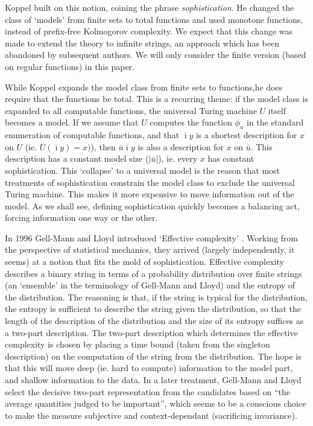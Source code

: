 \documentclass{style/llncs}
\newcommand{\br}[1]{\overline{#1}}
\begin{document}
Koppel \cite{koppelSoph1988,koppel1991almost} built on this notion, coining the phrase \emph{sophistication}. He changed the class of `models' from finite sets to total functions and used monotone functions, instead of prefix-free Kolmogorov complexity. We expect that this change was made to extend the theory to infinite strings, an approach which has been abandoned by subsequent authors. We will only consider the finite version (based on regular functions) in this paper.

While Koppel expands the model class from finite sets to functions,he does require that the functions be total. This is a recurring theme: if the model class is expanded to all computable functions, the universal Turing machine $U$ itself becomes a model. If we assume that $U$ computes the function $\phi_u$ in the standard enumeration of computable functions, and that $\bar\imath y$ is a shortest description for $x$ on $U$ (ie. $U(\bar\imath y) = x)$), then $\br{u}\br{\imath}y$ is also a description for $x$ on $\bar u$. This description has a constant model size ($|\br{u}|$), ie. every $x$ has constant sophistication. This `collapse' to a universal model is the reason that most treatments of sophistication constrain the model class to exclude the universal Turing machine. This makes it more expensive to move information out of the model. As we shall see, defining sophistication quickly becomes a balancing act, forcing information one way or the other.

In 1996 Gell-Mann and Lloyd introduced `Effective complexity' \cite{gellmann1996information}. Working from the perspective of statistical mechanics, they arrived (largely independently, it seems) at a notion that fits the mold of sophistication. Effective complexity describes a binary string in terms of a probability distribution over finite strings (an `ensemble' in the terminology of Gell-Mann and Lloyd) and the entropy of the distribution. The reasoning is that, if the string is typical for the distribution, the entropy is sufficient to describe the string given the distribution, so that the length of the description of the distribution and the size of its entropy suffices as a two-part description. The two-part description which determines the effective complexity is chosen by placing a time bound (taken from the singleton description) on the computation of the string from the distribution. The hope is that this will move deep (ie. hard to compute) information to the model part, and shallow information to the data. In a later treatment\cite{gell2004nonextensive}, Gell-Mann and Lloyd select the decisive two-part representation from the candidates based on ``the average quantities judged to be important'', which seems to be a conscious choice to make the measure subjective and context-dependant (sacrificing invariance).
\end{document}
